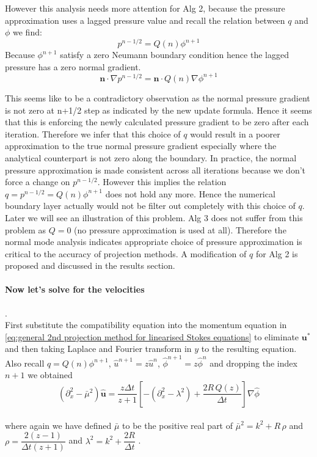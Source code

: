 However this analysis needs more attention for Alg 2, because the pressure approximation uses a lagged pressure value and recall the relation between $q$ and $\phi$ we find:
\begin{equation*}
p^{n-1/2} = Q(n)\phi^{n+1}
\end{equation*}
Because $\phi^{n+1}$ satisfy a zero Neumann boundary condition hence the lagged pressure has a zero normal gradient.
\begin{equation}
\textbf{n}\cdot \nabla p^{n-1/2} = \textbf{n}\cdot Q(n)\nabla \phi^{n+1}
\end{equation}

This seems like to be a contradictory observation as the normal pressure gradient is not zero at n+1/2 step as indicated by the new update formula. Hence it seems that this is enforcing the newly calculated pressure gradient to be zero after each iteration. Therefore we infer that this choice of $q$ would result in a poorer approximation to the true normal pressure gradient especially where the analytical counterpart is not zero along the boundary. In practice, the normal pressure approximation is made consistent across all iterations because we don't force a change on $p^{n-1/2}$. However this implies the relation $q = p^{n-1/2}= Q(n)\phi^{n+1}$ does not hold any more. Hence the numerical boundary layer actually would not be filter out completely with this choice of $q$. Later we will see an illustration of this problem. Alg 3 does not suffer from this problem as $Q = 0$ (no pressure approximation is used at all). Therefore the normal mode analysis indicates appropriate choice of pressure approximation is critical to the accuracy of projection methods. A modification of $q$ for Alg 2 is proposed and discussed in the results section.\\

\paragraph*{Now let's solve for the velocities}.\\
First substitute the compatibility equation into the momentum equation in \eqref{eq:general 2nd projection method for linearised Stokes equations} to eliminate $\textbf{u}^*$ and then taking Laplace and Fourier transform in $y$ to the resulting equation.\\
Also recall $q = Q(n)\phi^{n+1}$, $\hat{u}^{n+1} = z \hat{u}^n$, $\hat{\phi}^{n+1} = z \hat{\phi}^n$ and dropping the index $n+1$ we obtained
\begin{equation}
(\partial_x^2 - \bar{\mu}^2) \hat{\textbf{u}} = \dfrac{z \Delta t}{z + 1} [- (\partial_x^2 - \lambda^2) + \dfrac{2 R \, Q(z)}{\Delta t}] \nabla \hat{\phi}
\end{equation}\\
where again we have defined $\bar{\mu}$ to be the positive real part of $\bar{\mu}^2 = k^2 + R \, \rho$ and $\rho = \dfrac{2(z - 1)}{\Delta t (z + 1)}$ and $\lambda^2 = k^2 + \dfrac{2 R}{\Delta t}$ \cite{brown2001accurate}.\\

